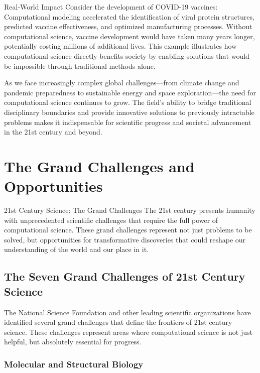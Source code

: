 \begin{examplebox}{Real-World Impact}
Consider the development of COVID-19 vaccines: Computational modeling accelerated the identification of viral protein structures, predicted vaccine effectiveness, and optimized manufacturing processes. Without computational science, vaccine development would have taken many years longer, potentially costing millions of additional lives. This example illustrates how computational science directly benefits society by enabling solutions that would be impossible through traditional methods alone.
\end{examplebox}

As we face increasingly complex global challenges—from climate change and pandemic preparedness to sustainable energy and space exploration—the need for computational science continues to grow. The field's ability to bridge traditional disciplinary boundaries and provide innovative solutions to previously intractable problems makes it indispensable for scientific progress and societal advancement in the 21st century and beyond.

\section{The Grand Challenges and Opportunities}

\begin{conceptcard}{21st Century Science: The Grand Challenges}
The 21st century presents humanity with unprecedented scientific challenges that require the full power of computational science. These grand challenges represent not just problems to be solved, but opportunities for transformative discoveries that could reshape our understanding of the world and our place in it.
\end{conceptcard}

\subsection{The Seven Grand Challenges of 21st Century Science}

The National Science Foundation and other leading scientific organizations have identified several grand challenges that define the frontiers of 21st century science. These challenges represent areas where computational science is not just helpful, but absolutely essential for progress.

\subsubsection{Molecular and Structural Biology}

